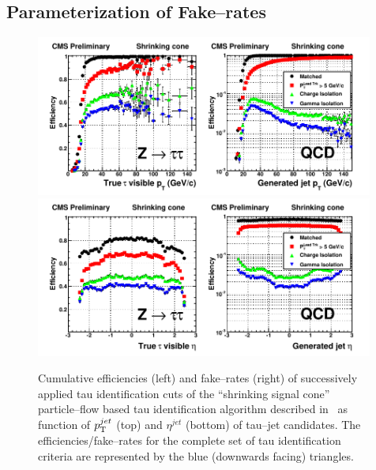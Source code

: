 \subsection{Parameterization of Fake--rates}
\label{secFakeRateParametrization}
%
\begin{figure}[t]
\setlength{\unitlength}{1mm}
\begin{center}
\includegraphics*[width=0.99\textwidth]{backgrounds_chapter/figures/valStyle_HighEfficiency_pt.pdf}
\includegraphics*[width=0.99\textwidth]{backgrounds_chapter/figures/valStyle_HighEfficiency_eta.pdf}
\caption[$\pt$ and $\eta$ dependency of tau ID performance]{Cumulative
efficiencies (left) and fake--rates (right) of successively applied tau
identification cuts of the ``shrinking signal cone'' particle--flow based tau
identification algorithm described in~\cite{CMS-PAS-PFT-08-001} as function of
$p_{\mathrm{T}}^{jet}$ (top) and $\eta^{jet}$ (bottom) of tau--jet candidates.  The
efficiencies/fake--rates for the complete set of tau identification criteria are
represented by the blue (downwards facing) triangles.}
\label{figPFTauReco_EfficienciesAndFakeRates}
\end{center}
\end{figure} 

